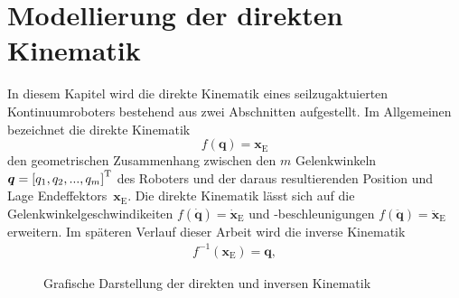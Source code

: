 \chapter{Modellierung der direkten Kinematik}

In diesem Kapitel wird die direkte Kinematik eines seilzugaktuierten Kontinuumroboters bestehend aus zwei Abschnitten aufgestellt. Im Allgemeinen bezeichnet die direkte Kinematik 
%
\begin{equation}
\label{eq:direkteKinematik}
f(\bm{q}) = \bm{x}_\mathrm{E}
\end{equation}
%
den geometrischen Zusammenhang zwischen den $m$ Gelenkwinkeln $\bm{q} = \left[q_1, q_2, ..., q_m \right]^{\mathrm{T}} $ des Roboters und der daraus resultierenden Position und Lage Endeffektors~$\bm{x}_\mathrm{E}$.
Die direkte Kinematik lässt sich auf die Gelenkwinkelgeschwindikeiten $f(\bm{\dot{q}}) = \bm{\dot{x}}_\mathrm{E} $ und -beschleunigungen $f(\bm{\ddot{q}}) = \bm{\ddot{x}}_\mathrm{E}$ erweitern. Im späteren Verlauf dieser Arbeit wird die inverse Kinematik
%
\begin{align}
f^{-1}(\bm{x}_\mathrm{E}) = \bm{q},
\label{eq:inverseKinematik}
\end{align}

\begin{figure}[b]
\centering
{}
\caption{Grafische Darstellung der direkten und inversen Kinematik}
\label{fig:kinematik}
\end{figure}

